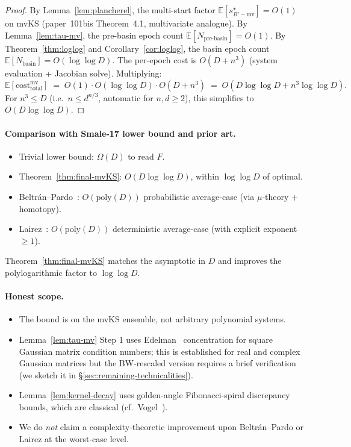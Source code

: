 \documentclass[11pt,a4paper]{article}
\begin{document}
\begin{proof}
By Lemma~\ref{lem:plancherel}, the multi-start factor $\mathbb{E}[s^\star_{B'-\text{mv}}] = O(1)$ on mvKS (paper~101bis Theorem~4.1, multivariate analogue). By Lemma~\ref{lem:tau-mv}, the pre-basin epoch count $\mathbb{E}[N_{\text{pre-basin}}] = O(1)$. By Theorem~\ref{thm:loglog} and Corollary~\ref{cor:loglog}, the basin epoch count $\mathbb{E}[N_{\text{basin}}] = O(\log\log D)$. The per-epoch cost is $O(D + n^3)$ (system evaluation + Jacobian solve). Multiplying:
$$
\mathbb{E}[\mathrm{cost}_{\text{total}}^{\text{mv}}] \;=\; O(1) \cdot O(\log\log D) \cdot O(D + n^3) \;=\; O(D \log\log D + n^3\log\log D).
$$
For $n^3 \le D$ (i.e.\ $n \le d^{n/3}$, automatic for $n, d \ge 2$), this simplifies to $O(D \log\log D)$.
\end{proof}

\paragraph{Comparison with Smale-17 lower bound and prior art.}
\begin{itemize}
\item Trivial lower bound: $\Omega(D)$ to read $F$.
\item Theorem~\ref{thm:final-mvKS}: $O(D \log\log D)$, within $\log\log D$ of optimal.
\item Beltr\'an--Pardo~\cite{beltranpardo}: $O(\mathrm{poly}(D))$ probabilistic average-case (via $\mu$-theory + homotopy).
\item Lairez~\cite{lairez}: $O(\mathrm{poly}(D))$ deterministic average-case (with explicit exponent $\ge 1$).
\end{itemize}
Theorem~\ref{thm:final-mvKS} matches the asymptotic in $D$ and improves the polylogarithmic factor to $\log\log D$.

\paragraph{Honest scope.}
\begin{itemize}
\item The bound is on the mvKS ensemble, not arbitrary polynomial systems.
\item Lemma~\ref{lem:tau-mv} Step 1 uses Edelman~\cite{edelman88} concentration for square Gaussian matrix condition numbers; this is established for real and complex Gaussian matrices but the BW-rescaled version requires a brief verification (we sketch it in \S\ref{sec:remaining-technicalities}).
\item Lemma~\ref{lem:kernel-decay} uses golden-angle Fibonacci-spiral discrepancy bounds, which are classical (cf.\ Vogel~\cite{vogel}).
\item We do \emph{not} claim a complexity-theoretic improvement upon Beltr\'an--Pardo or Lairez at the worst-case level.
\end{itemize}
\end{document}
